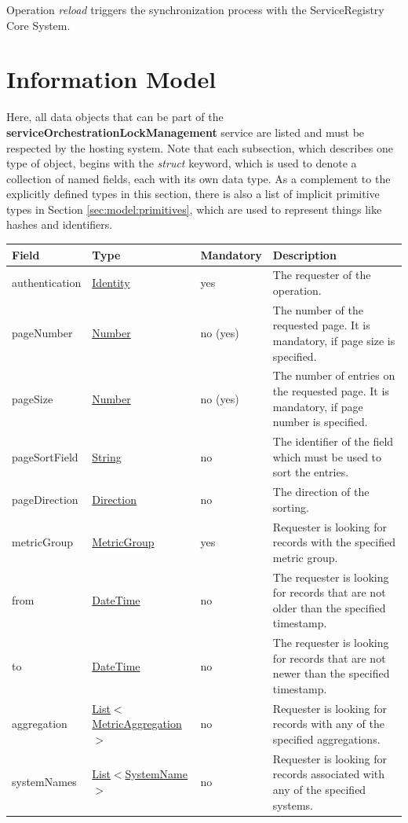 \documentclass[a4paper]{arrowhead}
\newcommand{\pref}[1]{{\textcolor{ArrowheadGrey}{\hyperref[sec:model:primitives:#1]{#1}}}}
\begin{document}
Operation \textit{reload} triggers the synchronization process with the ServiceRegistry Core System.

\clearpage

\section{Information Model}
\label{sec:model}

Here, all data objects that can be part of the \textbf{serviceOrchestrationLockManagement} service are listed and must be respected by the hosting system.
Note that each subsection, which describes one type of object, begins with the \textit{struct} keyword, which is used to denote a collection of named fields, each with its own data type.
As a complement to the explicitly defined types in this section, there is also a list of implicit primitive types in Section \ref{sec:model:primitives}, which are used to represent things like hashes and identifiers.



\begin{table}[ht!]
\begin{tabularx}{\textwidth}{| p{3cm} | p{5.5cm} | p{2cm} | X |} \hline
\rowcolor{gray!33} Field & Type & Mandatory & Description \\ \hline
authentication & \hyperref[sec:model:Identity]{Identity} & yes & The requester of the operation. \\ \hline
pageNumber & \pref{Number} & no (yes) & The number of the requested page. It is mandatory, if page size is specified. \\ \hline
pageSize & \pref{Number} & no (yes) & The number of entries on the requested page. It is mandatory, if page number is specified. \\ \hline
pageSortField & \pref{String} & no & The identifier of the field which must be used to sort the entries. \\ \hline
pageDirection & \pref{Direction} & no & The direction of the sorting. \\ \hline
metricGroup & \pref{MetricGroup} & yes & Requester is looking for records with the specified metric group. \\ \hline
from & \pref{DateTime} & no & The requester is looking for records that are not older than the specified timestamp. \\ \hline
to & \pref{DateTime} & no & The requester is looking for records that are not newer than the specified timestamp. \\ \hline
aggregation & \pref{List}$<$\pref{MetricAggregation}$>$ & no & Requester is looking for records with any of the specified aggregations. \\ \hline
systemNames & \pref{List}$<$\pref{SystemName}$>$ & no & Requester is looking for records associated with any of the specified systems. \\ \hline
\end{tabularx}
\end{table}
\end{document}
